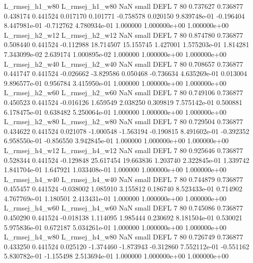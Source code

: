 L_rmsej_h1_w80 L_rmsej_h1_w80                   NaN      small     DEFL                 7 80 0.737627       0.736877 0.438174       0.441524    0.017170      0.101771     -0.758578     0.020150   9.839748e-01 -0.196404 8.447981e-01    -0.712762   4.780934e-01            1.000000    1.000000e+00        1.000000e+00
L_rmsej_h2_w12 L_rmsej_h2_w12                   NaN      small     DEFL                 7 80 0.874780       0.736877 0.508440       0.441524   -0.112988     18.714507     15.155745     1.427001   1.575203e-01  1.814281 7.343099e-02     2.639174   1.000895e-02            1.000000    1.000000e+00        1.000000e+00
L_rmsej_h2_w40 L_rmsej_h2_w40                   NaN      small     DEFL                 7 80 0.708657       0.736877 0.441747       0.441524   -0.026662     -3.829586      0.050468    -0.736634   4.635269e-01  0.013004 9.896577e-01     0.956784   3.415950e-01            1.000000    1.000000e+00        1.000000e+00
L_rmsej_h2_w60 L_rmsej_h2_w60                   NaN      small     DEFL                 7 80 0.749106       0.736877 0.450523       0.441524   -0.016126      1.659549      2.038250     0.309819   7.575142e-01  0.500881 6.178475e-01     0.638482   5.250064e-01            1.000000    1.000000e+00        1.000000e+00
L_rmsej_h2_w80 L_rmsej_h2_w80                   NaN      small     DEFL                 7 80 0.729504       0.736877 0.434622       0.441524    0.021078     -1.000548     -1.563194    -0.190815   8.491602e-01 -0.392352 6.958550e-01    -0.856550   3.942845e-01            1.000000    1.000000e+00        1.000000e+00
L_rmsej_h4_w12 L_rmsej_h4_w12                   NaN      small     DEFL                 7 80 0.925646       0.736877 0.528344       0.441524   -0.129848     25.617454     19.663836     1.203740   2.322845e-01  1.339742 1.841704e-01     1.647921   1.033408e-01            1.000000    1.000000e+00        1.000000e+00
L_rmsej_h4_w40 L_rmsej_h4_w40                   NaN      small     DEFL                 7 80 0.744879       0.736877 0.455457       0.441524   -0.038002      1.085910      3.155812     0.186740   8.523433e-01  0.714902 4.767769e-01     1.180501   2.413431e-01            1.000000    1.000000e+00        1.000000e+00
L_rmsej_h4_w60 L_rmsej_h4_w60                   NaN      small     DEFL                 7 80 0.745086       0.736877 0.450290       0.441524   -0.018138      1.114095      1.985444     0.230692   8.181504e-01  0.530021 5.975836e-01     0.672187   5.034261e-01            1.000000    1.000000e+00        1.000000e+00
L_rmsej_h4_w80 L_rmsej_h4_w80                   NaN      small     DEFL                 7 80 0.726749       0.736877 0.433250       0.441524    0.025120     -1.374460     -1.873943    -0.312860   7.552112e-01 -0.551162 5.830782e-01    -1.155498   2.513694e-01            1.000000    1.000000e+00        1.000000e+00
